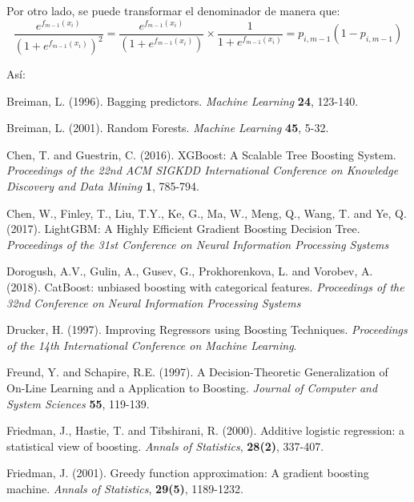 \documentclass[12pt,twoside]{article}
\begin{document}
Por otro lado, se puede transformar el denominador de manera que:
\begin{equation*}
\frac{e^{f_{m-1}(x_i)}}{(1 + e^{f_{m-1}(x_i)})^2} = \frac{e^{f_{m-1}(x_i)}}{(1 + e^{f_{m-1}(x_i)})} \times \frac{1}{1 + e^{f_{m-1}(x_i)}} = p_{i, m-1}(1 - p_{i, m-1})
\end{equation*}

Así:





\newpage
{}
\begin{thebibliography}{100}
 Breiman, L. (1996). Bagging predictors. \textit{Machine Learning} \textbf{24}, 123-140.

 Breiman, L. (2001). Random Forests. \textit{Machine Learning} \textbf{45}, 5-32.

 Chen, T. and Guestrin, C. (2016). XGBoost: A Scalable Tree Boosting System. \textit{Proceedings of the 22nd ACM SIGKDD International Conference on Knowledge Discovery and Data Mining} \textbf{1}, 785-794.

 Chen, W., Finley, T., Liu, T.Y., Ke, G., Ma, W., Meng, Q., Wang, T. and Ye, Q. (2017). LightGBM: A Highly Efficient Gradient Boosting Decision Tree. \textit{Proceedings of the 31st Conference on Neural Information Processing Systems}

 Dorogush, A.V., Gulin, A., Gusev, G., Prokhorenkova, L. and Vorobev, A. (2018). CatBoost: unbiased boosting with categorical features. \textit{Proceedings of the 32nd Conference on Neural Information Processing Systems}

 Drucker, H. (1997). Improving Regressors using Boosting Techniques. \textit{Proceedings of the 14th International Conference on Machine Learning}.

 Freund, Y. and Schapire, R.E. (1997). A Decision-Theoretic Generalization of On-Line Learning and a Application to Boosting. \textit{Journal of Computer and System Sciences} \textbf{55}, 119-139.

 Friedman, J., Hastie, T. and Tibshirani, R. (2000). Additive logistic regression: a statistical view of boosting. \textit{Annals of Statistics}, \textbf{28(2)}, 337-407.

 Friedman, J. (2001). Greedy function approximation: A gradient boosting machine. \textit{Annals of Statistics}, \textbf{29(5)}, 1189-1232.


\end{thebibliography}
\end{document}
